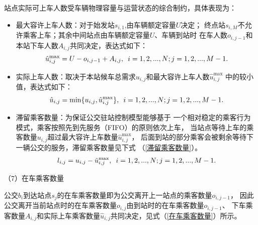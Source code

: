 站点实际可上车人数受车辆物理容量与运营状态的综合制约，具体表现为：
\begin{itemize}
    \item 最大容许上车人数：对于始发站$s_{i,1}$,由车辆额定容量$U$决定；
    终点站$s_{i,M}$不允许乘客上车；其余中间站点由车辆额定容量$U$、车辆到站时
    在车人数$o_{i,j-1}$和本站下车人数$A_{i,j}$共同决定，表达式如下：
    \begin{equation}
        \hat{u}_{i,j}^{\max} = U - o_{i,j-1} + A_{i,j},\hspace{0.5em} i = 1,2,...,N; j =1,2,...,M-1.
    \end{equation}
    \item 实际上车人数：取决于本站候车总需求$u_{i,j}$和最大容许上车人数$\hat{u}_{i,j}^{\max}$
    中的较小值，表达式如下：
    \begin{equation}
        \hat{u}_{i,j} = \min\{ u_{i,j}, \hat{u}_{i,j}^{\max}\} ,\hspace{0.5em} i = 1,2,...,N; j =1,2,...,M-1.
    \end{equation}
    \item 滞留乘客数量：为保证公交驻站控制模型能够基于
    一个相对稳定的乘客行为模式，乘客按照先到先服务（FIFO）的原则依次上车，
    当站点等待上车的乘客数量$u_{i,j}$超过最大容许上车数量$\hat{u}_{i,j}^{\max}$，
    后面到站的部分乘客会被剩余等待下一辆公交的服务，滞留乘客数量见下式
    （\ref{滞留乘客数量}）。
    \begin{equation}\label{滞留乘客数量}
        l_{i,j} = u_{i,j} - \hat{u}_{i,j}^{\max} ,\hspace{0.5em} i = 1,2,...,N; j =1,2,...,M-1.
    \end{equation}
\end{itemize}




（7）在车乘客数量

公交$b_{i}$到达站点$s_j$的在车乘客数量即为公交离开上一站点的乘客数量$o_{i,j-1}$，
因此公交离开当前站点时的在车乘客数量$o_{i,j}$由到站时的在车乘客数量$o_{i,j-1}$、
下车乘客数量$A_{i,j}$和实际上车乘客数量$\hat{u}_{i,j}$共同决定，见式（\ref{在车乘客数量}）所示。


